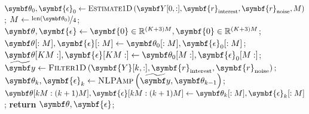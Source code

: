 \begin{algorithm}
    \caption{
        Routine for estimating a sequence of \ac{1D} \acp{FID} which exhibit
        variation in amplitudes across increments. \textsc{NLPAmp} denotes a
        routine which is akin to \textsc{NLP} (Algorithm \ref{alg:nlp}), except
        only amplitudes are allowed to be altered, whilst phases, frequencies
        and damping factors are fixed.
    }
    \label{alg:estimate-seq}
    \begin{algorithmic}[1]
        \State $\bth_0, \symbf{\epsilon}_0 \gets \textsc{Estimate$1$D}\left(
            \bY[0, :],
            \symbf{r}_{\text{interest}},
            \symbf{r}_{\text{noise}},
            M
            \right)
        $;
        \State $M \gets \nicefrac{\text{len}\left(\bth_0\right)}{4}$;
        \State $\bth, \symbf{\epsilon} \gets  \symbf{0} \in \mathbb{R}^{(K + 3)M}, \symbf{0} \in \mathbb{R}^{(K + 3)M}$;
        \State $\bth[:M], \symbf{\epsilon}[:M] \gets \bth_0[:M], \symbf{\epsilon}_0[:M]$;
        \State $\bth[KM:], \symbf{\epsilon}[KM:] \gets \bth_0[M:], \symbf{\epsilon}_0[M:]$;
            \State $\widetilde{\by} \gets \textsc{Filter$1$D}\left(
                \symbf{Y}[k,:],
                \symbf{r}_{\text{interest}},
                \symbf{r}_{\text{noise}}
                \right);
                $
            \State $\bth_{k}, \symbf{\epsilon}_k \gets \textsc{NLPAmp}\left(\widetilde{\by}, \bth_{k-1}\right)$;
            \State $\bth[kM : (k+1)M], \symbf{\epsilon}[kM : (k+1)M] \gets \bth_k[:M], \symbf{\epsilon}_k[:M]$;
        \EndFor
        \State \textbf{return} $\bth, \symbf{\epsilon}$;
        \EndProcedure
    \end{algorithmic}
\end{algorithm}

